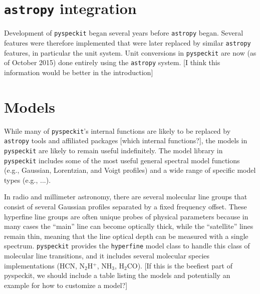 \documentclass[twocolumn]{aastex61}
\newcommand{\pyspeckit}{\texttt{pyspeckit}\xspace}
\newcommand{\astropy}{\texttt{astropy}\xspace}
\begin{document}
\section{\astropy integration}
Development of \pyspeckit began several years before \astropy began.  Several
features were therefore implemented that were later replaced by similar
\astropy features, in particular the unit system.  Unit conversions in
\pyspeckit are now (as of October 2015) done entirely using the \astropy
system. [I think this information would be better in the introduction]

\section{Models}
While many of \pyspeckit's internal functions are likely to be replaced by
\astropy tools and affiliated packages [which internal functions?], the models in \pyspeckit are likely to
remain useful indefinitely.  The model library in \pyspeckit includes some of
the most useful general spectral model functions (e.g., Gaussian, Lorentzian,
and Voigt profiles) and a wide range of specific model types (e.g., ...).

In radio and millimeter astronomy, there are several molecular line groups that
consist of several Gaussian profiles separated by a fixed frequency offset.
These hyperfine line groups are often unique probes of physical parameters
because in many cases the ``main'' line can become optically thick, while the
``satellite'' lines remain thin, meaning that the line optical depth can be
measured with a single spectrum.  \pyspeckit provides the \texttt{hyperfine}
model class to handle this class of molecular line transitions, and it includes
several molecular species implementations (HCN, N$_2$H$^+$, NH$_3$,
H$_2$CO). [If this is the beefiest part of pyspeckit, we should include a table
listing the models and potentially an example for how to customize a model?]
\end{document}
